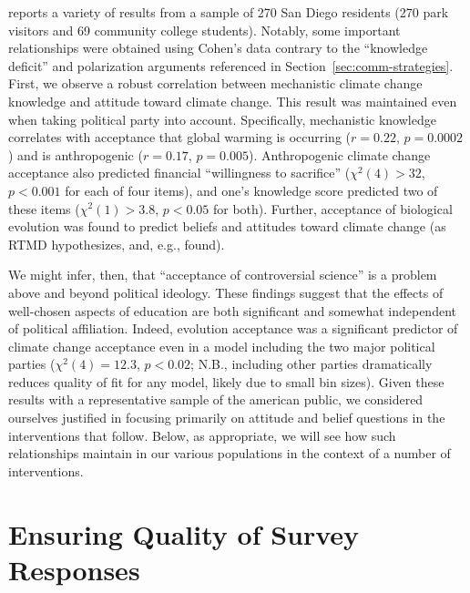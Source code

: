 \textcite{cohen_san_2012_f} reports a variety of results from a sample of 270
San Diego residents (270 park visitors and 69 community college students).
Notably, some important relationships were obtained using Cohen’s data contrary
to the “knowledge deficit” and polarization arguments referenced in
Section~\ref{sec:comm-strategies}. First, we observe a robust correlation
between mechanistic climate change knowledge and attitude toward climate change.
This result was maintained even when taking political party into account.
Specifically, mechanistic knowledge correlates with acceptance that global
warming is occurring ($r=0.22$, $p=0.0002$) and is anthropogenic ($r=0.17$,
$p=0.005$).  Anthropogenic climate change acceptance also predicted financial
“willingness to sacrifice” ($χ^2(4) > 32$, $p<0.001$ for each of four items),
and one’s knowledge score predicted two of these items ($χ^2(1) > 3.8$, $p<0.05$
for both). Further, acceptance of biological evolution was found to predict
beliefs and attitudes toward climate change (as RTMD hypothesizes, and, e.g.,
\cite{ranney_why_2012} found). 

We might infer, then, that “acceptance of controversial science” is a problem
above and beyond political ideology. These findings suggest that the effects of
well-chosen aspects of education are both significant and somewhat independent
of political affiliation. Indeed, evolution acceptance was a significant
predictor of climate change acceptance even in a model including the two major
political parties ($\chi^2(4)=12.3$, $p<0.02$; N.B., including other parties
dramatically reduces quality of fit for any model, likely due to small bin
sizes). Given these results with a representative sample of the american public,
we considered ourselves justified in focusing primarily on attitude and belief
questions in the interventions that follow.  
Below, as appropriate, we will see how such relationships maintain
in our various populations in the context of a number of interventions.

% 

\section{Ensuring Quality of Survey Responses}
\label{sec:attitude-quality}

